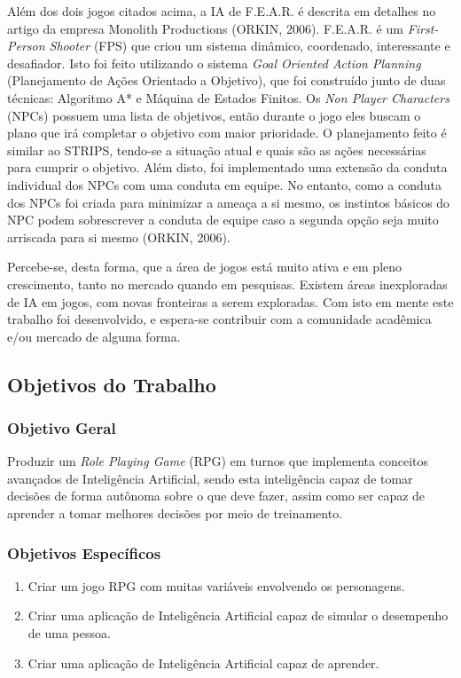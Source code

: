 \documentclass[12pt,a4paper]{article}
\begin{document}
	Além dos dois jogos citados acima, a IA de F.E.A.R. é descrita em detalhes no artigo da empresa Monolith Productions (ORKIN, 2006).
	F.E.A.R. é um \textit{First-Person Shooter} (FPS) que criou um sistema dinâmico, coordenado, interessante e desafiador.
	Isto foi feito utilizando o sistema \textit{Goal Oriented Action Planning} (Planejamento de Ações Orientado a Objetivo),
	que foi construído junto de duas técnicas: Algoritmo A* e Máquina de Estados Finitos.
	Os \textit{Non Player Characters} (NPCs) possuem uma lista de objetivos,
	então durante o jogo eles buscam o plano que irá completar o objetivo com maior prioridade.
	O planejamento feito é similar ao STRIPS,
	tendo-se a situação atual e quais são as ações necessárias para cumprir o objetivo.
	Além disto, foi implementado uma extensão da conduta individual dos NPCs
	com uma conduta em equipe.
	No entanto, como a conduta dos NPCs foi criada para minimizar a ameaça a si mesmo,
	os instintos básicos do NPC podem sobrescrever a conduta de equipe
	caso a segunda opção seja muito arriscada para si mesmo (ORKIN, 2006).
	
	Percebe-se, desta forma, que a área de jogos está muito ativa e em pleno crescimento,
	tanto no mercado quando em pesquisas.
	Existem áreas inexploradas de IA em jogos,
	com novas fronteiras a serem exploradas.
	Com isto em mente este trabalho foi desenvolvido,
	e espera-se contribuir com a comunidade acadêmica e/ou mercado de alguma forma.

	\FloatBarrier
	\subsection{Objetivos do Trabalho}
	
		\FloatBarrier
		\subsubsection{Objetivo Geral}
			Produzir um \textit{Role Playing Game} (RPG) em turnos que implementa conceitos avançados de Inteligência Artificial,
			sendo esta inteligência capaz de tomar decisões de forma autônoma sobre o que deve fazer,
			assim como ser capaz de aprender a tomar melhores decisões por meio de treinamento.
		
		\FloatBarrier
		\subsubsection{Objetivos Específicos}
			\begin{enumerate}[noitemsep]
				\item Criar um jogo RPG com muitas variáveis envolvendo os personagens.
				\item Criar uma aplicação de Inteligência Artificial capaz de simular o desempenho de uma pessoa.
				\item Criar uma aplicação de Inteligência Artificial capaz de aprender.
			\end{enumerate}			
	
\end{document}

